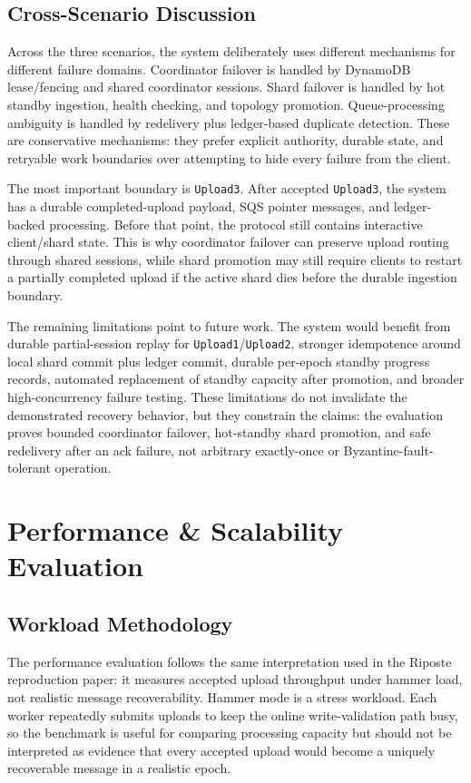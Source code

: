 \documentclass[conference]{IEEEtran}
\begin{document}
\subsection{Cross-Scenario Discussion}

Across the three scenarios, the system deliberately uses different mechanisms for different failure domains. Coordinator failover is handled by DynamoDB lease/fencing and shared coordinator sessions. Shard failover is handled by hot standby ingestion, health checking, and topology promotion. Queue-processing ambiguity is handled by redelivery plus ledger-based duplicate detection. These are conservative mechanisms: they prefer explicit authority, durable state, and retryable work boundaries over attempting to hide every failure from the client.

The most important boundary is \texttt{Upload3}. After accepted \texttt{Upload3}, the system has a durable completed-upload payload, SQS pointer messages, and ledger-backed processing. Before that point, the protocol still contains interactive client/shard state. This is why coordinator failover can preserve upload routing through shared sessions, while shard promotion may still require clients to restart a partially completed upload if the active shard dies before the durable ingestion boundary.

The remaining limitations point to future work. The system would benefit from durable partial-session replay for \texttt{Upload1}/\texttt{Upload2}, stronger idempotence around local shard commit plus ledger commit, durable per-epoch standby progress records, automated replacement of standby capacity after promotion, and broader high-concurrency failure testing. These limitations do not invalidate the demonstrated recovery behavior, but they constrain the claims: the evaluation proves bounded coordinator failover, hot-standby shard promotion, and safe redelivery after an ack failure, not arbitrary exactly-once or Byzantine-fault-tolerant operation.

\section{Performance \& Scalability Evaluation}

\subsection{Workload Methodology}

The performance evaluation follows the same interpretation used in the Riposte reproduction paper: it measures accepted upload throughput under hammer load, not realistic message recoverability. Hammer mode is a stress workload. Each worker repeatedly submits uploads to keep the online write-validation path busy, so the benchmark is useful for comparing processing capacity but should not be interpreted as evidence that every accepted upload would become a uniquely recoverable message in a realistic epoch.
\end{document}
